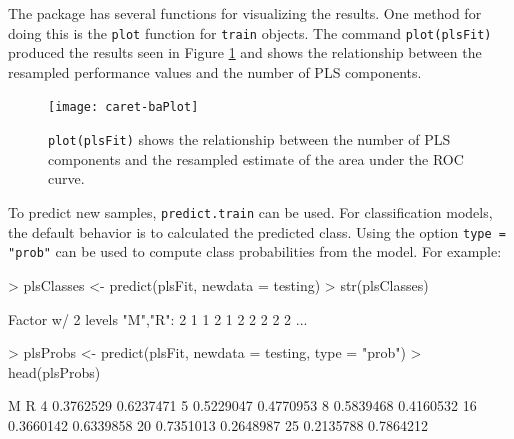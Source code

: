 \documentclass[12pt]{article}
\newcommand{\code}[1]{\mbox{\footnotesize\color{darkblue}\texttt{#1}}}
\renewenvironment{Schunk}{\vspace{\topsep}}{\vspace{\topsep}}
\begin{document}
The package has several functions for visualizing the results. One method for doing this is the \code{plot} function for \code{train} objects. The command \code{plot(plsFit)} produced the results seen in Figure \ref{F:pls} and shows the relationship between the resampled performance values and the number of PLS components. 

\begin{figure}
  \begin{center}  
\texttt{[image: caret-baPlot]}
    \caption{
      \code{plot(plsFit)} shows
      the relationship between the number of
      PLS components and the resampled
      estimate of the area under the ROC curve.  }
    \label{F:pls}         
  \end{center}
\end{figure}   


To predict new samples, \code{predict.train} can be used. For classification models, the default behavior is to calculated the predicted class. Using the option \code{type = "prob"} can be used to compute class probabilities from the model. For example:
\begin{Schunk}
\begin{Sinput}
> plsClasses <- predict(plsFit, newdata = testing)
> str(plsClasses)
\end{Sinput}
\begin{Soutput}
 Factor w/ 2 levels "M","R": 2 1 1 2 1 2 2 2 2 2 ...
\end{Soutput}
\begin{Sinput}
> plsProbs <- predict(plsFit, newdata = testing, type = "prob")
> head(plsProbs)
\end{Sinput}
\begin{Soutput}
           M         R
4  0.3762529 0.6237471
5  0.5229047 0.4770953
8  0.5839468 0.4160532
16 0.3660142 0.6339858
20 0.7351013 0.2648987
25 0.2135788 0.7864212
\end{Soutput}
\end{Schunk}
\end{document}
